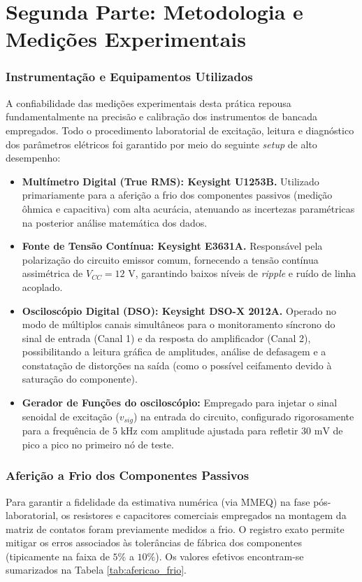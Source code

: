 \chapter{Segunda Parte: Metodologia e Medições Experimentais}

\subsection{Instrumentação e Equipamentos Utilizados}
A confiabilidade das medições experimentais desta prática repousa fundamentalmente na precisão e calibração dos instrumentos de bancada empregados. Todo o procedimento laboratorial de excitação, leitura e diagnóstico dos parâmetros elétricos foi garantido por meio do seguinte \textit{setup} de alto desempenho:

\begin{itemize}
	\item \textbf{Multímetro Digital (True RMS): Keysight U1253B.} Utilizado primariamente para a aferição a frio dos componentes passivos (medição ôhmica e capacitiva) com alta acurácia, atenuando as incertezas paramétricas na posterior análise matemática dos dados.
	\item \textbf{Fonte de Tensão Contínua: Keysight E3631A.} Responsável pela polarização do circuito emissor comum, fornecendo a tensão contínua assimétrica de $V_{CC} = 12\text{ V}$, garantindo baixos níveis de \textit{ripple} e ruído de linha acoplado.
	\item \textbf{Osciloscópio Digital (DSO): Keysight DSO-X 2012A.} Operado no modo de múltiplos canais simultâneos para o monitoramento síncrono do sinal de entrada (Canal 1) e da resposta do amplificador (Canal 2), possibilitando a leitura gráfica de amplitudes, análise de defasagem e a constatação de distorções na saída (como o possível ceifamento devido à saturação do componente).
	\item \textbf{Gerador de Funções do osciloscópio:} Empregado para injetar o sinal senoidal de excitação ($v_{sig}$) na entrada do circuito, configurado rigorosamente para a frequência de $5\text{ kHz}$ com amplitude ajustada para refletir $30\text{ mV}$ de pico a pico no primeiro nó de teste.
\end{itemize}

\subsection{Aferição a Frio dos Componentes Passivos}
Para garantir a fidelidade da estimativa numérica (via MMEQ) na fase pós-laboratorial, os resistores e capacitores comerciais empregados na montagem da matriz de contatos foram previamente medidos a frio. O registro exato permite mitigar os erros associados às tolerâncias de fábrica dos componentes (tipicamente na faixa de $5\%$ a $10\%$). Os valores efetivos encontram-se sumarizados na Tabela \ref{tab:afericao_frio}.

